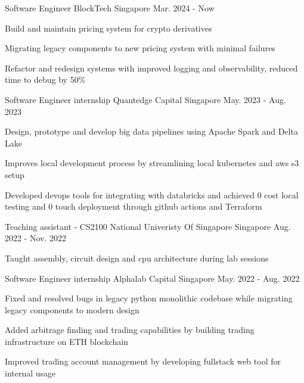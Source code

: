 

\begin{cventries}

  \cventry
    {Software Engineer}
    {BlockTech}
    {Singapore}
    {Mar. 2024 - Now}
    {
        \begin{cvitems}
            \item {Build and maintain pricing system for crypto derivatives}
            \item {Migrating legacy components to new pricing system with minimal failures}
            \item {Refactor and redesign systems with improved logging and observability, reduced time to debug by 50\%}
        \end{cvitems}
    }
  \cventry
    {Software Engineer internship}
    {Quantedge Capital}
    {Singapore}
    {May. 2023 - Aug. 2023}
    {
        \begin{cvitems}
            \item {Design, prototype and develop big data pipelines using Apache Spark and Delta Lake}
            \item {Improves local development process by streamlining local kubernetes and aws s3 setup}
            \item {Developed devops tools for integrating with databricks and achieved 0 cost local testing and 0 touch deployment through github actions and Terraform}
        \end{cvitems}
    }

  \cventry
    {Teaching assistant - CS2100}
    {National Univeristy Of Singapore}
    {Singapore}
    {Aug. 2022 - Nov. 2022}
    {
        \begin{cvitems}
            \item {Taught assembly, circuit design and cpu architecture during lab sessions}
        \end{cvitems}
    }

  \cventry
    {Software Engineer internship}
    {Alphalab Capital}
    {Singapore}
    {May. 2022 - Aug. 2022}
    {
        \begin{cvitems}
            \item {Fixed and resolved bugs in legacy python monolithic codebase while migrating legacy components to modern design}
            \item {Added arbitrage finding and trading capabilities by building trading infrastructure on ETH blockchain }
            \item {Improved trading account management by developing fullstack web tool for internal usage}
        \end{cvitems}
    }


\end{cventries}
